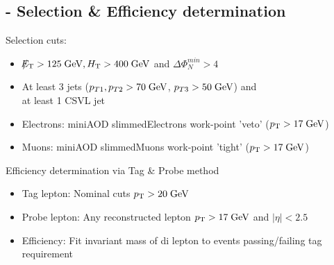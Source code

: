 \documentclass{beamer}
\begin{document}
\subsection{\Zll - Selection \& Efficiency determination}
\begin{frame}
Selection cuts:
\begin{itemize}
 \item $\slash\mkern-12mu{E}_{\text{T}} > 125 \;\text{Ge}\kern-0.06667em\text{V}, H_{\text{T}} > 400 \;\text{Ge}\kern-0.06667em\text{V} $ and $\Delta\Phi_{N}^{min}>4$
 \item At least 3 jets ($p_{T\text{1}},p_{T\text{2}} > 70\;\text{Ge}\kern-0.06667em\text{V}$, $p_{T\text{3}} > 50\;\text{Ge}\kern-0.06667em\text{V}$) and \\ at least 1 CSVL jet
 \item Electrons: miniAOD slimmedElectrons work-point 'veto' ($p_{\text{T}}>17\;\text{Ge}\kern-0.06667em\text{V}$)
 \item Muons: miniAOD slimmedMuons work-point 'tight' ($p_{\text{T}}>17\;\text{Ge}\kern-0.06667em\text{V}$)
\end{itemize}
Efficiency determination via Tag \& Probe method
\begin{itemize}
 \item Tag lepton: Nominal cuts $p_{\text{T}}>20\;\text{Ge}\kern-0.06667em\text{V}$
 \item Probe lepton: Any reconstructed lepton $p_{\text{T}}>17\;\text{Ge}\kern-0.06667em\text{V}$ and $|\eta|<2.5$
 \item Efficiency: Fit invariant mass of di lepton to events passing/failing tag requirement 
\end{itemize}
\end{frame}

\end{document}
